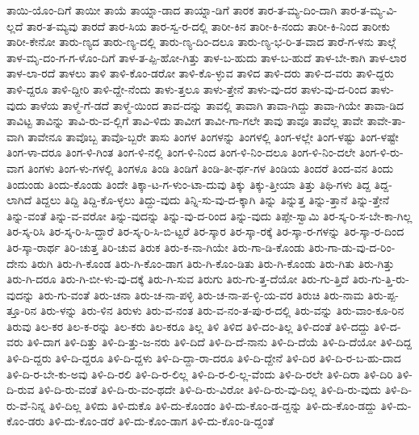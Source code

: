 {ತಾಯಿ-ಯೊಂ-ದಿಗೆ
ತಾಯೀ
ತಾಯೆ
ತಾಯ್ನಾ-ಡಾದ
ತಾಯ್ನಾ-ಡಿಗೆ
ತಾರಕ
ತಾರ-ತ-ಮ್ಯ-ದಿಂ-ದಾಗಿ
ತಾರ-ತ-ಮ್ಯ-ವಿ-ಲ್ಲದೆ
ತಾರ-ತ-ಮ್ಯವು
ತಾರದೆ
ತಾರ-ಸಿಯ
ತಾರ-ಸ್ವ-ರ-ದಲ್ಲಿ
ತಾರೀ-ಕಿನ
ತಾರೀ-ಕಿ-ನಂದು
ತಾರೀ-ಕಿ-ನಿಂದ
ತಾರೀಕು
ತಾರೀ-ಕೇನೋ
ತಾರು-ಣ್ಯದ
ತಾರು-ಣ್ಯ-ದಲ್ಲಿ
ತಾರು-ಣ್ಯ-ದಿಂ-ದಲೂ
ತಾರು-ಣ್ಯ-ಭ-ರಿ-ತ-ವಾದ
ತಾರೆ-ಗ-ಳನು
ತಾಲ್ಗೆ
ತಾಳ-ಮೃ-ದಂ-ಗ-ಗ-ಳೊಂ-ದಿಗೆ
ತಾಳ-ತ-ಪ್ಪಿ-ಹೋ-ಗಿತ್ತು
ತಾಳ-ಬ-ಹುದು
ತಾಳ-ಬ-ಹುದೆ
ತಾಳ-ಬೇ-ಕಾಗಿ
ತಾಳ-ಲಾರ
ತಾಳ-ಲಾ-ರದೆ
ತಾಳಲು
ತಾಳಿ
ತಾಳಿ-ಕೊಂ-ಡರೋ
ತಾಳಿ-ಕೊ-ಳ್ಳುವ
ತಾಳಿದ
ತಾಳಿ-ದರು
ತಾಳಿ-ದ-ವರು
ತಾಳಿ-ದ್ದರು
ತಾಳಿ-ದ್ದರೂ
ತಾಳಿ-ದ್ದೀರಿ
ತಾಳಿ-ದ್ದೇ-ನೆಂದು
ತಾಳು-ತ್ತಲೂ
ತಾಳು-ತ್ತೇನೆ
ತಾಳು-ವು-ದರ
ತಾಳು-ವು-ದ-ರಿಂದ
ತಾಳು-ವುದು
ತಾಳೆಯ
ತಾಳ್ಮೆ-ಗೆ-ಡದೆ
ತಾಳ್ಮೆ-ಯಿಂದ
ತಾವ-ದನ್ನು
ತಾವಲ್ಲಿ
ತಾವಾಗಿ
ತಾವಾ-ಗಿದ್ದು
ತಾವಾ-ಗಿಯೇ
ತಾವಾ-ಡಿದ
ತಾವಿಟ್ಟ
ತಾವಿನ್ನು
ತಾವಿ-ರು-ವ-ಲ್ಲಿಗೆ
ತಾವಿ-ಳಿದು
ತಾವೀಗ
ತಾವೀ-ಗಾ-ಗಲೇ
ತಾವು
ತಾವೂ
ತಾವೆಲ್ಲ
ತಾವೇ
ತಾವೇ-ತಾ-ವಾಗಿ
ತಾವೇನೂ
ತಾವೊಬ್ಬ
ತಾವೊ-ಬ್ಬರೇ
ತಾಸು
ತಿಂಗಳ
ತಿಂಗಳನ್ನು
ತಿಂಗಳಲ್ಲಿ
ತಿಂಗ-ಳಲ್ಲೇ
ತಿಂಗ-ಳಷ್ಟು
ತಿಂಗ-ಳಷ್ಟೇ
ತಿಂಗ-ಳಾ-ದರೂ
ತಿಂಗ-ಳಿ-ಗಿಂತ
ತಿಂಗ-ಳಿ-ನಲ್ಲಿ
ತಿಂಗ-ಳಿ-ನಿಂದ
ತಿಂಗ-ಳಿ-ನಿಂ-ದಲೂ
ತಿಂಗ-ಳಿ-ನಿಂ-ದಲೇ
ತಿಂಗ-ಳಿ-ರು-ವಾಗ
ತಿಂಗಳು
ತಿಂಗ-ಳು-ಗಳಲ್ಲಿ
ತಿಂಗಳೂ
ತಿಂಡಿ
ತಿಂಡಿಗೆ
ತಿಂಡಿ-ತೀ-ರ್ಥ-ಗಳ
ತಿಂಡಿಯ
ತಿಂದರೆ
ತಿಂದ-ವನ
ತಿಂದು
ತಿಂದುಂಡು
ತಿಂದು-ಕೊಂಡು
ತಿಂದೇ
ತಿಕ್ಕಾ-ಟ-ಗ-ಳುಂ-ಟಾ-ದುವು
ತಿಕ್ಕು
ತಿಕ್ಕು-ತ್ತೀಯಾ
ತಿತ್ತು
ತಿಥಿ-ಗಳು
ತಿದ್ದ
ತಿದ್ದ-ಲಾಗಿದೆ
ತಿದ್ದಲು
ತಿದ್ದಿ
ತಿದ್ದಿ-ಕೊ-ಳ್ಳಲು
ತಿದ್ದು-ವುದು
ತಿನ್ನಿ-ಸು-ವು-ದ-ಕ್ಕಾಗಿ
ತಿನ್ನು
ತಿನ್ನುತ್ತ
ತಿನ್ನು-ತ್ತಾನೆ
ತಿನ್ನು-ತ್ತೇನೆ
ತಿನ್ನು-ವಂತೆ
ತಿನ್ನು-ವ-ವರೋ
ತಿನ್ನು-ವುದನ್ನು
ತಿನ್ನು-ವು-ದ-ರಿಂದ
ತಿನ್ನು-ವುದು
ತಿಪ್ಪೇ-ಸ್ವಾಮಿ
ತಿರ-ಸ್ಕ-ರಿ-ಸ-ಬೇ-ಕಾ-ಗಿಲ್ಲ
ತಿರ-ಸ್ಕ-ರಿಸಿ
ತಿರ-ಸ್ಕ-ರಿ-ಸಿ-ದ್ದಾರೆ
ತಿರ-ಸ್ಕ-ರಿ-ಸಿ-ಬಿ-ಟ್ಟರೆ
ತಿರ-ಸ್ಕಾರ
ತಿರ-ಸ್ಕಾ-ರಕ್ಕೆ
ತಿರ-ಸ್ಕಾ-ರ-ಗಳನ್ನು
ತಿರ-ಸ್ಕಾ-ರ-ದಿಂದ
ತಿರ-ಸ್ಕಾ-ರಾರ್ಥ
ತಿರಿ-ಚುತ್ತ
ತಿರಿ-ಚುವ
ತಿರುಕ
ತಿರು-ಕ-ನಾ-ಗಿಯೇ
ತಿರು-ಗಾ-ಡಿ-ಕೊಂಡು
ತಿರು-ಗಾ-ಡು-ವು-ದ-ರಿಂ-ದೇನು
ತಿರುಗಿ
ತಿರು-ಗಿ-ಕೊಂಡ
ತಿರು-ಗಿ-ಕೊಂ-ಡಾಗ
ತಿರು-ಗಿ-ಕೊಂ-ಡಿತು
ತಿರು-ಗಿ-ಕೊಂಡು
ತಿರು-ಗಿತು
ತಿರು-ಗಿತ್ತು
ತಿರು-ಗಿ-ದರೂ
ತಿರು-ಗಿ-ಬೀ-ಳು-ವು-ದಕ್ಕೆ
ತಿರು-ಗಿ-ಸುವ
ತಿರುಗು
ತಿರು-ಗು-ತ್ತ-ದೆಯೋ
ತಿರು-ಗು-ತ್ತಿದೆ
ತಿರು-ಗು-ತ್ತಿ-ರು-ವುದನ್ನು
ತಿರು-ಗು-ವಂತೆ
ತಿರು-ಚನಾ
ತಿರು-ಚ-ನಾ-ಪಳ್ಳಿ
ತಿರು-ಚ-ನಾ-ಪ-ಳ್ಳಿ-ಯ-ವರ
ತಿರುಚಿ
ತಿರು-ನಾಮ
ತಿರು-ಪ್ಪ-ತ್ತೂ-ರಿನ
ತಿರು-ಳನ್ನು
ತಿರು-ಳಿನ
ತಿರುಳು
ತಿರು-ವ-ನಂತ
ತಿರು-ವ-ನಂ-ತ-ಪು-ರ-ದಲ್ಲಿ
ತಿರು-ವನ್ನು
ತಿರು-ವಾಂ-ಕೂ-ರಿನ
ತಿರುವು
ತಿಲ-ಕರ
ತಿಲ-ಕ-ರನ್ನು
ತಿಲ-ಕರು
ತಿಲ-ಕರೂ
ತಿಲ್ಲ
ತಿಳಿ
ತಿಳಿದ
ತಿಳಿ-ದಂ-ತಿಲ್ಲ
ತಿಳಿ-ದಂತೆ
ತಿಳಿ-ದದ್ದು
ತಿಳಿ-ದ-ವರು
ತಿಳಿ-ದಾಗ
ತಿಳಿ-ದಿತ್ತು
ತಿಳಿ-ದಿ-ತ್ತು-ಜ-ನರು
ತಿಳಿ-ದಿದೆ
ತಿಳಿ-ದಿ-ದೆ-ನಾನು
ತಿಳಿ-ದಿ-ದೆಯೆ
ತಿಳಿ-ದಿ-ದೆಯೋ
ತಿಳಿ-ದಿದ್ದ
ತಿಳಿ-ದಿ-ದ್ದರು
ತಿಳಿ-ದಿ-ದ್ದರೂ
ತಿಳಿ-ದಿ-ದ್ದಳು
ತಿಳಿ-ದಿ-ದ್ದಾ-ರಾ-ದರೂ
ತಿಳಿ-ದಿ-ದ್ದೇನೆ
ತಿಳಿ-ದಿರ
ತಿಳಿ-ದಿ-ರ-ಬ-ಹು-ದಾದ
ತಿಳಿ-ದಿ-ರ-ಬೇ-ಕು-ಅವು
ತಿಳಿ-ದಿ-ರಲಿ
ತಿಳಿ-ದಿ-ರ-ಲಿಲ್ಲ
ತಿಳಿ-ದಿ-ರ-ಲಿ-ಲ್ಲ-ವೆಂದು
ತಿಳಿ-ದಿ-ರಲೇ
ತಿಳಿ-ದಿರಾ
ತಿಳಿ-ದಿರಿ
ತಿಳಿ-ದಿ-ರುವ
ತಿಳಿ-ದಿ-ರು-ವಂತೆ
ತಿಳಿ-ದಿ-ರು-ವಂ-ಥದೇ
ತಿಳಿ-ದಿ-ರು-ವಿರೋ
ತಿಳಿ-ದಿ-ರು-ವು-ದಿಲ್ಲ
ತಿಳಿ-ದಿ-ರು-ವುದು
ತಿಳಿ-ದಿ-ರು-ವೆ-ನಿನ್ನ
ತಿಳಿ-ದಿಲ್ಲ
ತಿಳಿದು
ತಿಳಿ-ದುಕೊ
ತಿಳಿ-ದು-ಕೊಂಡಂ
ತಿಳಿ-ದು-ಕೊಂ-ಡ-ದ್ದನ್ನು
ತಿಳಿ-ದು-ಕೊಂ-ಡದ್ದು
ತಿಳಿ-ದು-ಕೊಂ-ಡರು
ತಿಳಿ-ದು-ಕೊಂ-ಡರೆ
ತಿಳಿ-ದು-ಕೊಂ-ಡಾಗ
ತಿಳಿ-ದು-ಕೊಂ-ಡಿ-ದ್ದಂತೆ
}
